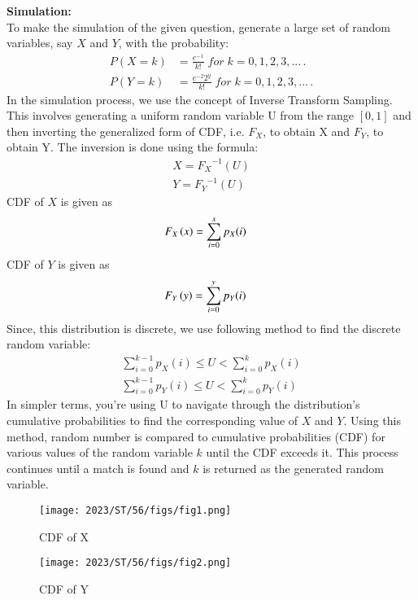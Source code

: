 \documentclass[journal,12pt,twocolumn]{IEEEtran}
\theoremstyle{remark}
\begin{document}
\textbf{Simulation:}\\
To make the simulation of the given question, generate a large set of random variables, say $X$ and $Y$, with the probability:
\begin{align}
	P(X=k)&=\frac{e^{-1}}{k!} \; for \; k=0,1,2,3,... \, .\\
	P(Y=k)&=\frac{e^{-2}2^{y}}{k!} \; for \; k=0,1,2,3,... \, .
\end{align}
In the simulation process, we use the concept of Inverse Transform Sampling. This involves generating a uniform random variable U from the range $[0, 1]$ and then inverting the generalized form of CDF, i.e. $F_X$, to obtain X and $F_Y$, to obtain Y. The inversion is done using the formula:
\begin{align}
	X = {F_{X}}^{-1}(U)\\
	Y = {F_{Y}}^{-1}(U) 
\end{align}
CDF of $X$ is given as 
\begin{align}
F_X\left(x\right)&=\sum_{i=0}^{x}p_X(i)
\end{align}
CDF of $Y$ is given as 
\begin{align}
F_Y\left(y\right)&=\sum_{i=0}^{y}p_Y(i)
\end{align}
Since, this distribution is discrete, we use following method to find the discrete random variable:
\begin{align}
	\sum_{i=0}^{k-1}p_X(i) \leq U < \sum_{i=0}^{k}p_X(i)\\
	\sum_{i=0}^{k-1}p_Y(i) \leq U < \sum_{i=0}^{k}p_Y(i)
\end{align}
In simpler terms, you're using U to navigate through the distribution's cumulative probabilities to find the corresponding value of $X$ and $Y$. Using this method, random number is compared to cumulative probabilities (CDF) for various values of the random variable $k$ until the CDF exceeds it. This process continues until a match is found and $k$ is returned as the generated random variable.
\begin{figure}[H]
\centering
\texttt{[image: 2023/ST/56/figs/fig1.png]}
\caption{CDF of X}
\label{fig:Theory vs Simulation}
\end{figure}
\begin{figure}[H]
\centering
\texttt{[image: 2023/ST/56/figs/fig2.png]}
\caption{CDF of Y}
\label{fig:Theory vs Simulation}
\end{figure}
\end{document}
